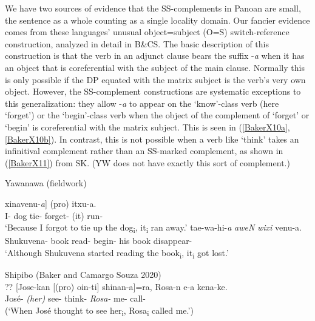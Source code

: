 \documentclass[output=paper]{langscibook}
\begin{document}
We have two sources of evidence that the SS-complements in Panoan are small, the sentence as a whole counting as a single locality domain. Our fancier evidence comes from these languages’ unusual object=subject (O=S) switch-ref\-er\-ence construction, analyzed in detail in B\&CS. The basic description of this construction is that the verb in an adjunct clause bears the suffix -\textit{a} when it has an object that is coreferential with the subject of the main clause. Normally this is only possible if the DP equated with the matrix subject is the verb’s very own object. However, the SS-complement constructions are systematic exceptions to this generalization: they allow -\textit{a} to appear on the ‘know’-class verb (here ‘forget’) or the ‘begin’-class verb when the object of the complement of ‘forget’ or ‘begin’ is coreferential with the matrix subject. This is seen in (\ref{BakerX10a}, \ref{BakerX10b}). In contrast, this is not possible when a verb like ‘think’ takes an infinitival complement rather than an SS-marked complement, as shown in (\ref{BakerX11}) from SK. (YW does not have exactly this sort of complement.)

\begin{exe}
\ex Yawanawa (fieldwork) \label{BakerX10}
    \begin{xlist}
    \ex \label{BakerX10a}
		\gll [E-N [\textit{kaNmaN} nesha-ki-N] xinavenu-\textit{a}] (pro) itxu-a.\\
		     I- dog tie- forget- (it) run-\\
		    \glt `Because I forgot to tie up the dog\textsubscript{i}, it\textsubscript{i} ran away.'
	\ex \label{BakerX10b}
		\gll [Shukuvena-N [\textit{wixi} ane-ki-N] tae-wa-hi-\textit{a} \textit{aweN} \textit{wixi} venu-a.\\
			 Shukuvena- book read- begin- his book disappear-\\
		    \glt `Although Shukuvena started reading the book\textsubscript{i}, it\textsubscript{i} got lost.'
    \end{xlist}

\ex Shipibo (Baker and Camargo Souza 2020) \label{BakerX11}\\
    \gll ?? [Jose-kan [(pro) oin-ti] shinan-a]=ra, Rosa-n e-a kena-ke.\\
        {} José- \textit{(her)} see- think- \textit{Rosa-} me- call-\\
    \glt \phantom{??} (`When José thought to see her\textsubscript{i}, Rosa\textsubscript{i} called me.')
\end{exe}
\end{document}
